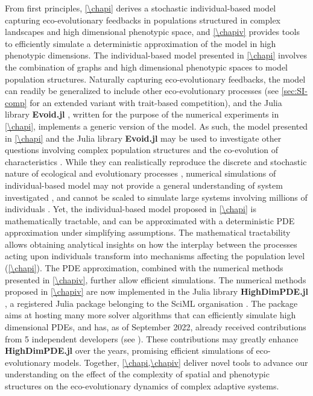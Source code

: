 From first principles, \cref{\chapi} derives a stochastic individual-based model capturing eco-evolutionary feedbacks in populations structured in complex landscapes and high dimensional phenotypic space, and \cref{\chapiv} provides tools to efficiently simulate a deterministic approximation of the model in high phenotypic dimensions.
% 
The individual-based model presented in \cref{\chapi} involves the combination of graphs and high dimensional phenotypic spaces to model population structures. Naturally capturing eco-evolutionary feedbacks, the model can readily be generalized to include other eco-evolutionary processes (see \cref{sec:SI-comp} for an extended variant with trait-based competition), and the Julia library \textbf{Evoid.jl} \cite{Evoid.jl}, written for the purpose of the numerical experiments in \cref{\chapi}, implements a generic version of the model. %
% 
As such, the model presented in \cref{\chapi} and the Julia library \textbf{Evoid.jl} may be used to investigate other questions involving complex population structures \citep{LiebermanHauert2005} and the co-evolution of characteristics \citep{Doebeli2011}.
% 
While they can realistically reproduce the discrete and stochastic nature of ecological and evolutionary processes \citep{Champagnat2006}, numerical simulations of individual-based model may not provide a general understanding of system investigated \citep{Lion2016,Hodgson2019}, and cannot be scaled to simulate large systems involving millions of individuals \citep{deangelis2005individual}. Yet, the individual-based model proposed in \cref{\chapi} is mathematically tractable, and can be approximated with a deterministic PDE approximation under simplifying assumptions.
% 
The mathematical tractability allows obtaining analytical insights on how the interplay between the processes acting upon individuals transform into mechanisms affecting the population level (\cref{\chapi}).
% 
The PDE approximation, combined with the numerical methods presented in \cref{\chapiv}, further allow efficient simulations. 
% 
The numerical methods proposed in \cref{\chapiv} are now implemented in the Julia library \textbf{HighDimPDE.jl} \citep{HighDimPDE}, a registered Julia package belonging to the SciML organisation \citep{SciML}.
%
The package aims at hosting many more solver algorithms that can efficiently simulate high dimensional PDEs, and has, as of September 2022, already received contributions from 5 independent developers (see \cite{https://github.com/SciML/HighDimPDE.jl/graphs/contributors}). These contributions may greatly enhance \textbf{HighDimPDE.jl} over the years, promising efficient simulations of eco-evolutionary models.
% 
% 
Together, \cref{\chapi,\chapiv} deliver novel tools to advance our understanding on the effect of the complexity of spatial and phenotypic structures on the eco-evolutionary dynamics of complex adaptive systems.


